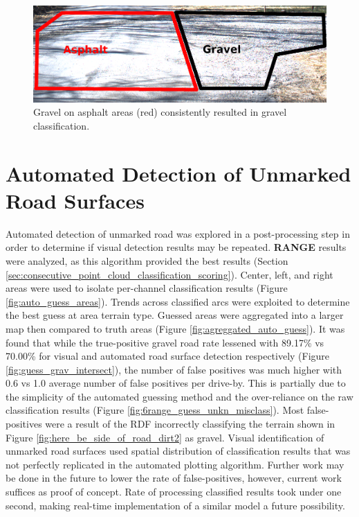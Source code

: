 \documentclass[numbered,pdftex]{ohio-etd}
\begin{document}
{{{		\begin{figure}[H]
			\centering
			\includegraphics[width=0.95\linewidth]{Defense_Images/gravel_on_asphalt}
			\caption[Gravel on Asphalt]{Gravel on asphalt areas (red) consistently resulted in gravel classification.}
			\label{fig:gravel_on_asphalt}
		\end{figure}
		
	
	}
	
	\section{Automated Detection of Unmarked Road Surfaces}\label{sec:auto_det}{
		
		
		{Automated detection of unmarked road was explored in a post-processing step in order to determine if visual detection results may be repeated. \textbf{RANGE} results were analyzed, as this algorithm provided the best results (Section \ref{sec:consecutive_point_cloud_classification_scoring}). Center, left, and right areas were used to isolate per-channel classification results (Figure \ref{fig:auto_guess_areas}). Trends across classified arcs were exploited to determine the best guess at area terrain type. Guessed areas were aggregated into a larger map then compared to truth areas (Figure \ref{fig:agreggated_auto_guess}). It was found that while the true-positive gravel road rate lessened with 89.17\% vs 70.00\% for visual and automated road surface detection respectively (Figure \ref{fig:guess_grav_intersect}), the number of false positives was much higher with 0.6 vs 1.0 average number of false positives per drive-by. This is partially due to the simplicity of the automated guessing method and the over-reliance on the raw classification results (Figure \ref{fig:6range_guess_unkn_misclass}). Most false-positives were a result of the RDF incorrectly classifying the terrain shown in Figure \ref{fig:here_be_side_of_road_dirt2} as gravel. Visual identification of unmarked road surfaces used spatial distribution of classification results that was not perfectly replicated in the automated plotting algorithm. Further work may be done in the future to lower the rate of false-positives, however, current work suffices as proof of concept. Rate of processing classified results took under one second, making real-time implementation of a similar model a future possibility. }
		
}}}
\end{document}
